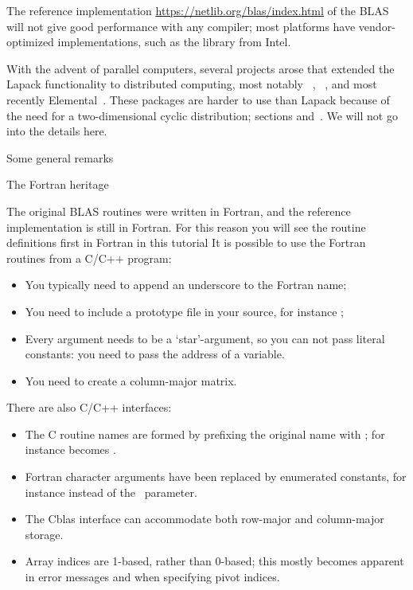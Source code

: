 \begin{remark}
  The reference implementation \url{https://netlib.org/blas/index.html}
  of the
  BLAS~\cite{reference-blas} will not give good performance with any
  compiler; most platforms have vendor-optimized implementations, such
  as the  library from Intel.
\end{remark}

With the advent of parallel computers, several projects arose that
extended the Lapack functionality to distributed computing, most
notably ~\cite{Choi:scalapack,scalapack-users-guide},
~\cite{PLAPACK,PLAPACK:UG},
and most recently Elemental~\cite{Elemental:TOMS}. These packages are
harder to use than Lapack because of the need for a
two-dimensional cyclic distribution; sections
 and~. We will not go into
the details here.

 {Some general remarks}

 {The Fortran heritage}

The original BLAS routines were written in Fortran, and the reference implementation
is still in Fortran. For this reason you will see the routine definitions first in Fortran
in this tutorial
It is possible to use the Fortran routines from a C/C++ program:
\begin{itemize}
\item You typically need to append an underscore to the Fortran name;
\item You need to include a prototype file in your source, for instance ;
\item Every argument needs to be a `star'-argument, so you can not pass literal constants:
  you need to pass the address of a variable.
\item You need to create a column-major matrix.
\end{itemize}
There are also C/C++ interfaces:
\begin{itemize}
\item The C routine names are formed by prefixing the original name with ;
  for instance  becomes .
\item Fortran character arguments have been replaced by enumerated constants,
  for instance  instead of the~ parameter.
\item The Cblas interface can accommodate both row-major and column-major storage.
\item Array indices are 1-based, rather than 0-based; this mostly
  becomes apparent in error messages and when specifying pivot
  indices.
\end{itemize}

